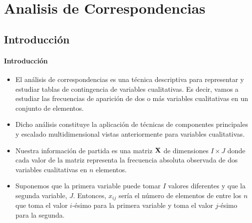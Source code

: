 




\chapter{Analisis de Correspondencias}
\section{Introducción}



\begin{frame}
\frametitle{Introducción}
\begin{itemize}
\item<2->{El análisis de correspondencias es una técnica descriptiva para representar y estudiar tablas de contingencia de variables cualitativas. Es decir, vamos a estudiar las frecuencias de aparición de dos o más variables cualitativas en un conjunto de elementos.}
\item<3->{Dicho análisis constituye la aplicación de técnicas de componentes principales y escalado multidimensional vistas anteriormente para variables cualitativas.}
\item<4->{Nuestra información de partida es una matriz $\mathbf{X}$ de dimensiones $I\times J$ donde cada valor de la matriz representa la frecuencia absoluta observada de dos variables cualitativas en $n$ elementos.}
\item<5->{Suponemos que la primera variable puede tomar $I$ valores diferentes y que la segunda variable, $J$. Entonces, $x_{ij}$ sería el número de elementos de entre los $n$ que toma el valor $i$-ésimo para la primera variable y toma el valor $j$-ésimo para la segunda.}
\end{itemize}
\end{frame}

